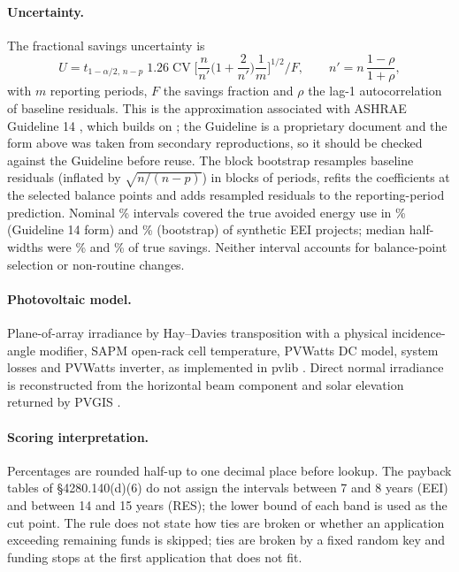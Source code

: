 \documentclass[11pt]{article}
\begin{document}
\paragraph{Uncertainty.} The fractional savings uncertainty is
\begin{equation}
U=t_{1-\alpha/2,\,n-p}\;1.26\;\mathrm{CV}\;\Big[\frac{n}{n'}\Big(1+\frac{2}{n'}\Big)\frac1m
\Big]^{1/2}\Big/F,\qquad n'=n\,\frac{1-\rho}{1+\rho},
\end{equation}
with $m$ reporting periods, $F$ the savings fraction and $\rho$ the lag-1 autocorrelation
of baseline residuals. This is the approximation associated with ASHRAE Guideline 14
\cite{ashrae2014guideline14}, which builds on \cite{reddy2000uncertainty}; the Guideline
is a proprietary document and the form above was taken from secondary reproductions,
so it should be checked against the Guideline before reuse. The block bootstrap
\cite{kunsch1989jackknife} resamples baseline residuals (inflated by $\sqrt{n/(n-p)}$) in
blocks of \CfgBootstrapBlock{} periods, refits the coefficients at the selected balance points and adds
resampled residuals to the reporting-period prediction. Nominal \CoverageNominal\%
intervals covered the true avoided energy use in \CoverageFsu\% (Guideline 14 form) and
\CoverageBootstrap\% (bootstrap) of \CoverageN{} synthetic EEI projects; median half-widths
were \HalfwidthFsu\% and \HalfwidthBootstrap\% of true savings. Neither interval accounts
for balance-point selection or non-routine changes.

\paragraph{Photovoltaic model.} Plane-of-array irradiance by Hay--Davies transposition
with a physical incidence-angle modifier, SAPM open-rack cell temperature, PVWatts DC
model, system losses and PVWatts inverter, as implemented in pvlib
\cite{holmgren2018pvlib}. Direct normal irradiance is reconstructed from the horizontal
beam component and solar elevation returned by PVGIS \cite{pvgis_api,pvgis_manual}.

\paragraph{Scoring interpretation.} Percentages are rounded half-up to one decimal place
before lookup. The payback tables of \S4280.140(d)(6) do not assign the intervals between
7 and 8 years (EEI) and between 14 and 15 years (RES); the lower bound of each band is
used as the cut point. The rule does not state how ties are broken or whether an
application exceeding remaining funds is skipped; ties are broken by a fixed random key
and funding stops at the first application that does not fit.
\end{document}
